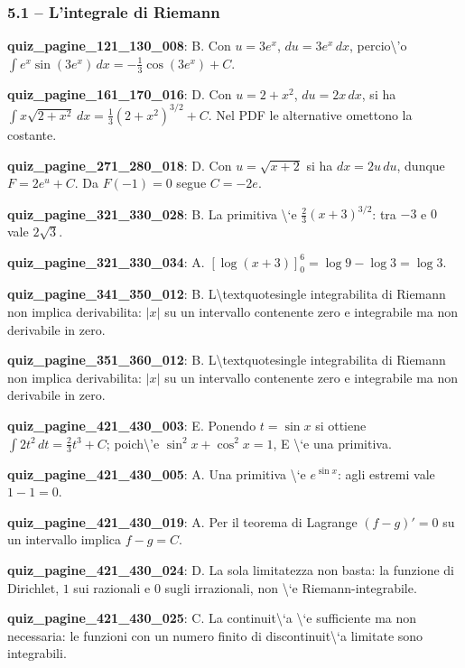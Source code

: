 \documentclass[11pt,a4paper]{article}
\newcounter{quiz}
\begin{document}
\subsubsection*{5.1 -- L’integrale di Riemann}
\noindent\textbf{quiz\_pagine\_121\_130\_008}: B. Con $u=3e^x$, $du=3e^x\,dx$, percio\textbackslash{}'o $\int e^x\sin(3e^x)\,dx=-\frac13\cos(3e^x)+C$.\par\medskip
\noindent\textbf{quiz\_pagine\_161\_170\_016}: D. Con $u=2+x^2$, $du=2x\,dx$, si ha $\int x\sqrt{2+x^2}\,dx=\frac13(2+x^2)^{3/2}+C$. Nel PDF le alternative omettono la costante.\par\medskip
\noindent\textbf{quiz\_pagine\_271\_280\_018}: D. Con $u=\sqrt{x+2}$ si ha $dx=2u\,du$, dunque $F=2e^u+C$. Da $F(-1)=0$ segue $C=-2e$.\par\medskip
\noindent\textbf{quiz\_pagine\_321\_330\_028}: B. La primitiva \textbackslash{}`e $\frac23(x+3)^{3/2}$: tra $-3$ e $0$ vale $2\sqrt3$.\par\medskip
\noindent\textbf{quiz\_pagine\_321\_330\_034}: A. $[\log(x+3)]_0^6=\log9-\log3=\log3$.\par\medskip
\noindent\textbf{quiz\_pagine\_341\_350\_012}: B. L\textbackslash{}textquotesingle integrabilita di Riemann non implica derivabilita: $|x|$ su un intervallo contenente zero e integrabile ma non derivabile in zero.\par\medskip
\noindent\textbf{quiz\_pagine\_351\_360\_012}: B. L\textbackslash{}textquotesingle integrabilita di Riemann non implica derivabilita: $|x|$ su un intervallo contenente zero e integrabile ma non derivabile in zero.\par\medskip
\noindent\textbf{quiz\_pagine\_421\_430\_003}: E. Ponendo $t=\sin x$ si ottiene $\int2t^2\,dt=\frac23t^3+C$; poich\textbackslash{}'e $\sin^2x+\cos^2x=1$, E \textbackslash{}`e una primitiva.\par\medskip
\noindent\textbf{quiz\_pagine\_421\_430\_005}: A. Una primitiva \textbackslash{}`e $e^{\sin x}$: agli estremi vale $1-1=0$.\par\medskip
\noindent\textbf{quiz\_pagine\_421\_430\_019}: A. Per il teorema di Lagrange $(f-g)\prime=0$ su un intervallo implica $f-g=C$.\par\medskip
\noindent\textbf{quiz\_pagine\_421\_430\_024}: D. La sola limitatezza non basta: la funzione di Dirichlet, $1$ sui razionali e $0$ sugli irrazionali, non \textbackslash{}`e Riemann-integrabile.\par\medskip
\noindent\textbf{quiz\_pagine\_421\_430\_025}: C. La continuit\textbackslash{}`a \textbackslash{}`e sufficiente ma non necessaria: le funzioni con un numero finito di discontinuit\textbackslash{}`a limitate sono integrabili.\par\medskip
\end{document}
